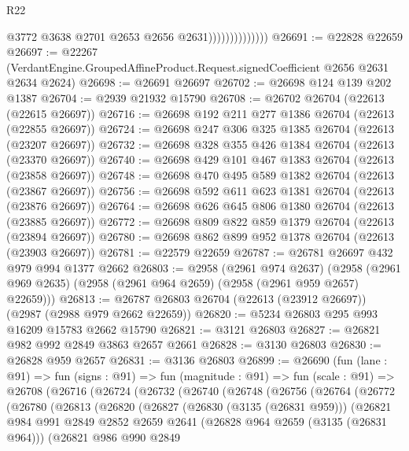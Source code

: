 \begin{lexlean}{R22}
\begin{coremodule}
                                @3772
                                @3638
                                @2701
                                @2653
                                @2656
                                @2631))))))))))))))
@26691 := @22828 @22659
@26697 := @22267
    (VerdantEngine.GroupedAffineProduct.Request.signedCoefficient @2656 @2631 @2634 @2624)
@26698 := @26691 @26697
@26702 := @26698 @124 @139 @202 @1387
@26704 := @2939 @21932 @15790
@26708 := @26702 @26704 (@22613 (@22615 @26697))
@26716 := @26698 @192 @211 @277 @1386 @26704 (@22613 (@22855 @26697))
@26724 := @26698 @247 @306 @325 @1385 @26704 (@22613 (@23207 @26697))
@26732 := @26698 @328 @355 @426 @1384 @26704 (@22613 (@23370 @26697))
@26740 := @26698 @429 @101 @467 @1383 @26704 (@22613 (@23858 @26697))
@26748 := @26698 @470 @495 @589 @1382 @26704 (@22613 (@23867 @26697))
@26756 := @26698 @592 @611 @623 @1381 @26704 (@22613 (@23876 @26697))
@26764 := @26698 @626 @645 @806 @1380 @26704 (@22613 (@23885 @26697))
@26772 := @26698 @809 @822 @859 @1379 @26704 (@22613 (@23894 @26697))
@26780 := @26698 @862 @899 @952 @1378 @26704 (@22613 (@23903 @26697))
@26781 := @22579 @22659
@26787 := @26781 @26697 @432 @979 @994 @1377 @2662
@26803 := @2958
    (@2961 @974 @2637)
    (@2958 (@2961 @969 @2635) (@2958 (@2961 @964 @2659) (@2958 (@2961 @959 @2657) @22659)))
@26813 := @26787 @26803 @26704 (@22613 (@23912 @26697)) (@2987 (@2988 @979 @2662 @22659))
@26820 := @5234 @26803 @295 @993 @16209 @15783 @2662 @15790
@26821 := @3121 @26803
@26827 := @26821 @982 @992 @2849 @3863 @2657 @2661
@26828 := @3130 @26803
@26830 := @26828 @959 @2657
@26831 := @3136 @26803
@26899 := @26690
    (fun (lane : @91) =>
    fun (signs : @91) =>
    fun (magnitude : @91) =>
    fun (scale : @91) =>
    @26708
      (@26716
        (@26724
          (@26732
            (@26740
              (@26748
                (@26756
                  (@26764
                    (@26772
                      (@26780
                        (@26813
                          (@26820
                            (@26827
                              (@26830 (@3135 (@26831 @959)))
                              (@26821
                                @984
                                @991
                                @2849
                                @2852
                                @2659
                                @2641
                                (@26828 @964 @2659 (@3135 (@26831 @964)))
                                (@26821
                                  @986
                                  @990
                                  @2849

\end{coremodule}
\end{lexlean}
